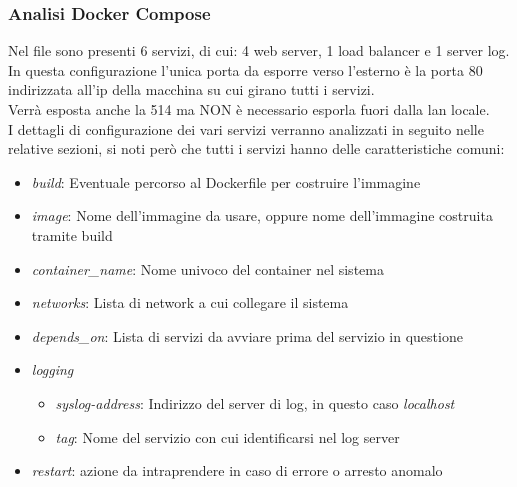 \documentclass[../DocumentazioneProgetto.tex]{subfiles}
\begin{document}
	\subsubsection{Analisi Docker Compose}
	Nel file sono presenti 6 servizi, di cui: 4 web server, 1 load balancer e 1 server log.\\
	In questa configurazione l'unica porta da esporre verso l'esterno è la porta 80 indirizzata all'ip della macchina su cui girano tutti i servizi.\\
	Verrà esposta anche la 514 ma NON è necessario esporla fuori dalla lan locale.\\
	I dettagli di configurazione dei vari servizi verranno analizzati in seguito nelle relative sezioni, si noti però
	che tutti i servizi hanno delle caratteristiche comuni:
	\begin{itemize}
		\item \textit{build}: Eventuale percorso al Dockerfile per costruire l'immagine
		\item \textit{image}: Nome dell'immagine da usare, oppure nome dell'immagine costruita tramite build
		\item \textit{container\_name}: Nome univoco del container nel sistema
		\item \textit{networks}: Lista di network a cui collegare il sistema
		\item \textit{depends\_on}: Lista di servizi da avviare prima del servizio in questione
		\item \textit{logging}
		\begin{itemize}
			\item \textit{syslog-address}: Indirizzo del server di log, in questo caso \textit{localhost} 
			\item \textit{tag}: Nome del servizio con cui identificarsi nel log server
		\end{itemize}
		\item \textit{restart}: azione da intraprendere in caso di errore o arresto anomalo
	\end{itemize}


\end{document}
